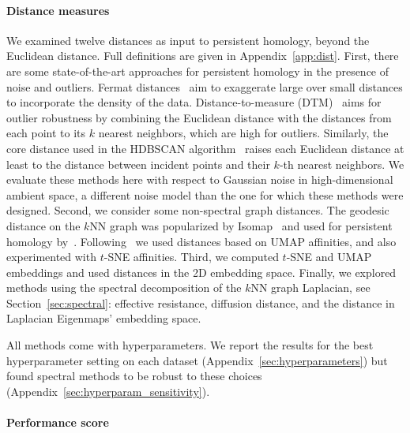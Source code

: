 \documentclass{article}
\theoremstyle{plain}
\theoremstyle{definition}
\theoremstyle{remark}
\begin{document}
\paragraph{Distance measures}

We examined twelve distances as input to persistent homology, beyond the Euclidean distance. Full definitions are given in Appendix~\ref{app:dist}. First, there are some state-of-the-art approaches for persistent homology in the presence of noise and outliers. Fermat distances~\citep{fernandez2023intrinsic} aim to exaggerate large over small distances to incorporate the density of the data. Distance-to-measure (DTM)~\citep{anai2020dtm} aims for outlier robustness by combining the Euclidean distance with the distances from each point to its $k$ nearest neighbors, which are high for outliers. Similarly, the core distance used in the HDBSCAN algorithm~\citep{campello2015hierarchical, damm2022core} raises each Euclidean distance at least to the distance between incident points and their $k$-th nearest neighbors. We evaluate these methods here with respect to Gaussian noise in high-dimensional ambient space, a different noise model than the one for which these methods were designed. Second, we consider some non-spectral graph distances. The geodesic distance on the $k$NN graph was popularized by Isomap~\citep{tenenbaum2000global} and used for persistent homology by~\citet{naitzat2020topology}. Following~\citet{gardner2022toroidal} we used distances based on UMAP affinities, and also experimented with $t$-SNE affinities. Third, we computed $t$-SNE and UMAP embeddings and used distances in the 2D embedding space. Finally, we explored methods using the spectral decomposition of the $k$NN graph Laplacian, see Section~\ref{sec:spectral}: effective resistance, diffusion distance, and the distance in Laplacian Eigenmaps' embedding space. 

All methods come with hyperparameters. We report the results for the best hyperparameter setting on each dataset (Appendix~\ref{sec:hyperparameters}) but found spectral methods to be robust to these choices (Appendix~\ref{sec:hyperparam_sensitivity}).

\paragraph{Performance score}\label{para:performance_metric}
\end{document}
